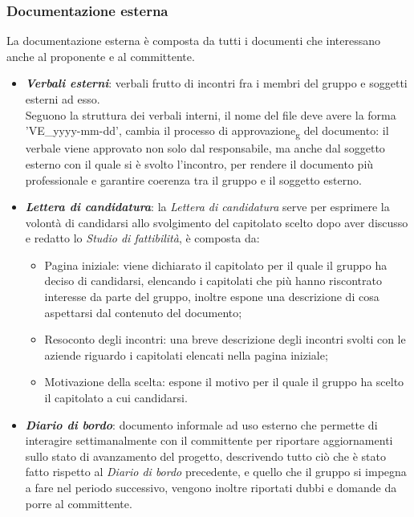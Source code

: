 \subsubsection{Documentazione esterna}
La documentazione esterna è composta da tutti i documenti che interessano anche
al proponente e al committente.
\begin{itemize}
    \item \textit{\textbf{Verbali esterni}}: verbali frutto di incontri fra i membri del gruppo e soggetti esterni ad esso.\\
          Seguono la struttura dei verbali interni, il nome del file deve avere la forma 'VE\_yyyy-mm-dd', cambia il processo di approvazione\textsubscript{g} del documento:
          il verbale viene approvato non solo dal responsabile, ma anche dal soggetto esterno con il quale si è svolto l'incontro,
          per rendere il documento più professionale e garantire coerenza tra il gruppo e il soggetto esterno.
    \item \textit{\textbf{Lettera di candidatura}}: la \textit{Lettera di candidatura} serve per esprimere la volontà di candidarsi allo svolgimento del capitolato scelto dopo aver discusso e redatto lo \textit{Studio di fattibilità},
          è composta da:
          \begin{itemize}
              \item Pagina iniziale: viene dichiarato il capitolato per il quale il gruppo ha
                    deciso di candidarsi, elencando i capitolati che più hanno riscontrato
                    interesse da parte del gruppo, inoltre espone una descrizione di cosa
                    aspettarsi dal contenuto del documento;
              \item Resoconto degli incontri: una breve descrizione degli incontri svolti con le
                    aziende riguardo i capitolati elencati nella pagina iniziale;
              \item Motivazione della scelta: espone il motivo per il quale il gruppo ha scelto il
                    capitolato a cui candidarsi.
          \end{itemize}
    \item \textit{\textbf{Diario di bordo}}: documento informale ad uso esterno che permette di interagire settimanalmente con il committente per riportare aggiornamenti sullo stato di
          avanzamento del progetto, descrivendo tutto ciò che è stato fatto rispetto al \textit{Diario di bordo} precedente,
          e quello che il gruppo si impegna a fare nel periodo successivo, vengono inoltre riportati dubbi e domande da porre al committente.

\end{itemize}
